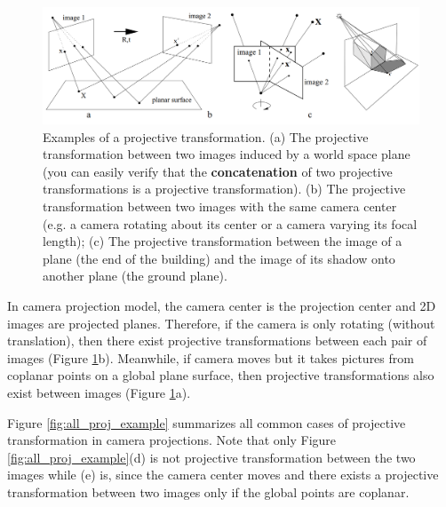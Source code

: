 \documentclass[12pt]{article}
\numberwithin{equation}{section}
\begin{document}
\begin{figure}[h]
\begin{center}
\includegraphics[width=1.0\textwidth]{proj_example.png}
\end{center}
\caption{Examples of a projective transformation. (a) The projective transformation between two images induced by a world space plane (you can easily verify that the \textbf{concatenation} of two
projective transformations is a projective transformation). (b) The projective transformation between
two images with the same camera center (e.g. a camera rotating about its center or a camera varying its focal length); (c) The projective transformation between the image of a plane (the end of the building) and the image of its shadow onto another plane (the ground plane). }
\label{fig:proj_example}
\end{figure}

In camera projection model, the camera center is the projection center and 2D images are projected planes. Therefore, if the camera is only rotating (without translation), then there exist projective transformations between each pair of images (Figure \ref{fig:proj_example}b). Meanwhile, if camera moves but it takes pictures from coplanar points on a global plane surface, then projective transformations also exist between images (Figure \ref{fig:proj_example}a).

Figure \ref{fig:all_proj_example} summarizes all common cases of projective transformation in camera projections. Note that only Figure \ref{fig:all_proj_example}(d) is not projective transformation between the two images while (e) is, since the camera center moves and there exists a projective transformation between two images only if the global points are coplanar.
\end{document}

